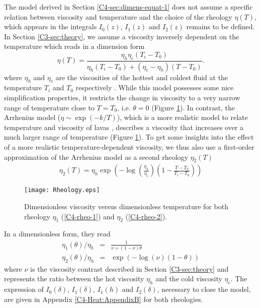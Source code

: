 The model derived in  Section \ref{C4-sec:dimens-equat-1} does not assume
a specific relation  between viscosity and temperature  and the choice
of the  rheology $\eta(T)$, which  appears in the  integrals $I_0(z)$,
$I_1(z)$   and   $I_2(z)$   remains   to  be   defined.    In   Section
\ref{C3-sec:theory},  we assume  a viscosity  inversely dependent  on the
temperature which reads in a dimension form
\begin{equation}
  \eta(T)=\frac{\eta_h
    \eta_c(T_i-T_0)}{\eta_h(T_i-T_0)+(\eta_c-\eta_h)(T-T_0)}.
\end{equation}
where $\eta_h$  and $\eta_c$  are the viscosities  of the  hottest and
coldest  fluid  at  the   temperature  $T_i$  and  $T_0$  respectively
\citep{Bercovici:2007vc}.   While  this   model  possesses  some  nice
simplification properties, it  restricts the change in  viscosity to a
very narrow  range of  temperature close  to $T=T_0$,  i.e. $\theta=0$
(Figure   \ref{C4-Rheology}).   In   contrast,  the   Arrhenius  model
($\eta \sim  \exp(-k/T)$), which is  a more realistic model  to relate
temperature and viscosity of lavas \citep{Blatt:2ViMWPc0}, describes a
viscosity  that increases  over  a much  larger  range of  temperature
(Figure \ref{C4-Rheology}).  To get some insights into the effect of a
more  realistic temperature-dependent  viscosity, we  thus also  use a
first-order approximation of the Arrhenius  model as a second rheology
$\eta_2(T)$ \citep{Diniega:2013eh}
\begin{eqnarray}
  \eta_2(T)                          =                          \eta_h
  \exp\left(-\log\left(\frac{\eta_h}{\eta_c}\right)\left(1-\frac{T-T_0}{T_i-T_0}\right)\right)
\end{eqnarray}
\begin{figure}[htbp]
  \begin{center}
    \graphicspath{ {/Users/thorey/Documents/These/Projet/Refroidissement/Skin_Model/Figure/Figure_Heating/} }
    \texttt{[image: Rheology.eps]}
    \caption{Dimensionless viscosity  versus dimensionless temperature
      for   both  rheology   $\eta_1$   (\ref{C4-rheo-1})  and   $\eta_2$
      (\ref{C4-rheo-2}).}
    \label{C4-Rheology}
  \end{center}
\end{figure}
In a dimensionless form, they read
\begin{eqnarray}
  \eta_1(\theta)/\eta_h&=&\frac{1}{\nu+(1-\nu)\theta} \label{C4-rheo-1}\\
  \eta_2(\theta)/\eta_h&=&\exp\left(-\log(\nu)\left(1-\theta\right)\right)  \label{C4-rheo-2}
\end{eqnarray}
where   $\nu$  is   the  viscosity   contrast  described   in  Section
\ref{C3-sec:theory} and  represents the  ratio between the  hot viscosity
$\eta_h$  and   the  cold  viscosity  $\eta_c$.    The  expression  of
$I_0(\delta)$, $I_1(\delta)$, $I_1(h)$ and $I_2(\delta)$, necessary to
close the model,  are given in Appendix  \ref{C4-Heat:AppendixB} for both
rheologies.

